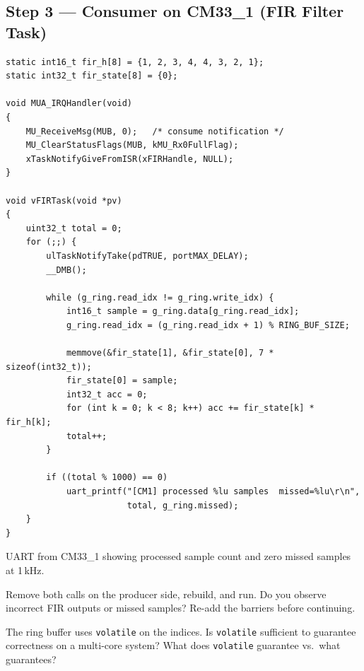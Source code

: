 \documentclass[11pt, a4paper]{article}
\begin{document}
\subsection{Step 3 --- Consumer on CM33\_1 (FIR Filter Task)}

\begin{lstlisting}[style=cstyle]
static int16_t fir_h[8] = {1, 2, 3, 4, 4, 3, 2, 1};
static int32_t fir_state[8] = {0};

void MUA_IRQHandler(void)
{
    MU_ReceiveMsg(MUB, 0);   /* consume notification */
    MU_ClearStatusFlags(MUB, kMU_Rx0FullFlag);
    xTaskNotifyGiveFromISR(xFIRHandle, NULL);
}

void vFIRTask(void *pv)
{
    uint32_t total = 0;
    for (;;) {
        ulTaskNotifyTake(pdTRUE, portMAX_DELAY);
        __DMB();

        while (g_ring.read_idx != g_ring.write_idx) {
            int16_t sample = g_ring.data[g_ring.read_idx];
            g_ring.read_idx = (g_ring.read_idx + 1) % RING_BUF_SIZE;

            memmove(&fir_state[1], &fir_state[0], 7 * sizeof(int32_t));
            fir_state[0] = sample;
            int32_t acc = 0;
            for (int k = 0; k < 8; k++) acc += fir_state[k] * fir_h[k];
            total++;
        }

        if ((total % 1000) == 0)
            uart_printf("[CM1] processed %lu samples  missed=%lu\r\n",
                        total, g_ring.missed);
    }
}
\end{lstlisting}

\begin{checkpointbox}[~C]
  UART from CM33\_1 showing processed sample count and zero missed samples at 1\,kHz.
\end{checkpointbox}

\begin{questionbox}[~C1]
  Remove both  calls on the producer side, rebuild, and run. Do you
  observe incorrect FIR outputs or missed samples? Re-add the barriers before
  continuing.
\end{questionbox}

\begin{questionbox}[~C2]
  The ring buffer uses \texttt{volatile} on the indices. Is \texttt{volatile}
  sufficient to guarantee correctness on a multi-core system? What does
  \texttt{volatile} guarantee vs.\ what  guarantees?
\end{questionbox}

\end{document}
